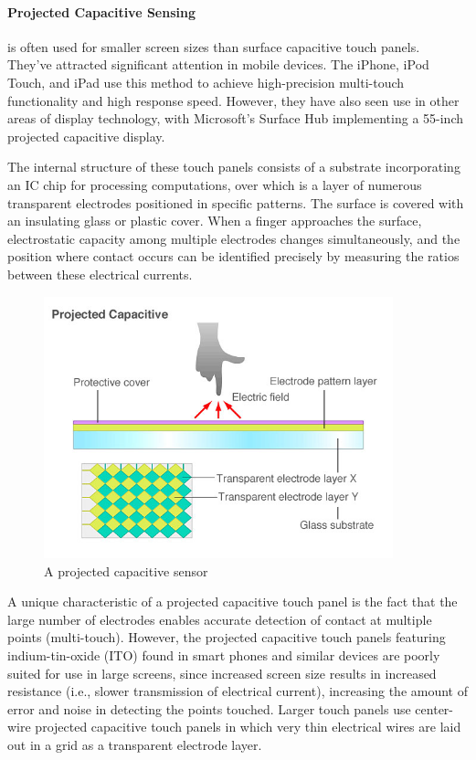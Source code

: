 \documentclass[11pt]{report}
\begin{document}
\paragraph{Projected Capacitive Sensing}

is often used for smaller screen sizes than surface capacitive touch panels. 
They've attracted significant attention in mobile devices. 
The iPhone, iPod Touch, and iPad use this method to achieve high-precision multi-touch functionality and high response speed.
However, they have also seen use in other areas of display technology, with Microsoft's Surface Hub implementing a 55-inch projected capacitive display.

The internal structure of these touch panels consists of a substrate incorporating an IC chip for processing computations, over which is a layer of numerous transparent electrodes positioned in specific patterns. 
The surface is covered with an insulating glass or plastic cover. 
When a finger approaches the surface, electrostatic capacity among multiple electrodes changes simultaneously, and the position where contact occurs can be identified precisely by measuring the ratios between these electrical currents.

\begin{figure}
\includegraphics[width=0.9\textwidth]{projcap}
\caption{A projected capacitive sensor}
\end{figure}

A unique characteristic of a projected capacitive touch panel is the fact that the large number of electrodes enables accurate detection of contact at multiple points (multi-touch). 
However, the projected capacitive touch panels featuring indium-tin-oxide (ITO) found in smart phones and similar devices are poorly suited for use in large screens, since increased screen size results in increased resistance (i.e., slower transmission of electrical current), increasing the amount of error and noise in detecting the points touched.
Larger touch panels use center-wire projected capacitive touch panels in which very thin electrical wires are laid out in a grid as a transparent electrode layer.
 
\end{document}
